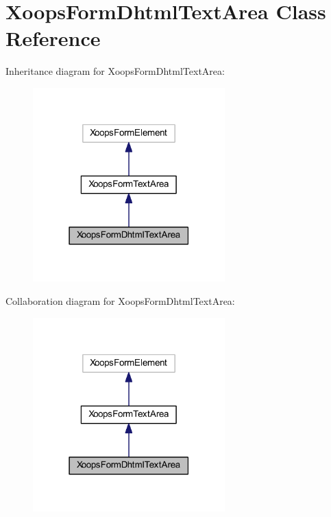 \hypertarget{class_xoops_form_dhtml_text_area}{\section{Xoops\-Form\-Dhtml\-Text\-Area Class Reference}
\label{class_xoops_form_dhtml_text_area}
}


Inheritance diagram for Xoops\-Form\-Dhtml\-Text\-Area\-:
\nopagebreak
\begin{figure}[H]
\begin{center}
\leavevmode
\includegraphics[width=210pt]{class_xoops_form_dhtml_text_area__inherit__graph}
\end{center}
\end{figure}


Collaboration diagram for Xoops\-Form\-Dhtml\-Text\-Area\-:
\nopagebreak
\begin{figure}[H]
\begin{center}
\leavevmode
\includegraphics[width=210pt]{class_xoops_form_dhtml_text_area__coll__graph}
\end{center}
\end{figure}
